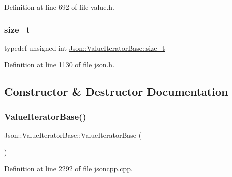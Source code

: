 Definition at line 692 of file value.\+h.

\hypertarget{class_json_1_1_value_iterator_base_a9d3a3c7ce5cdefe23cb486239cf07bb5}{}\label{class_json_1_1_value_iterator_base_a9d3a3c7ce5cdefe23cb486239cf07bb5} 
\subsubsection{\texorpdfstring{size\+\_\+t}{size\_t}\hspace{0.1cm}{\footnotesize\ttfamily [2/2]}}
{\footnotesize\ttfamily typedef unsigned int \hyperlink{class_json_1_1_value_iterator_base_a9d3a3c7ce5cdefe23cb486239cf07bb5}{Json\+::\+Value\+Iterator\+Base\+::size\+\_\+t}}



Definition at line 1130 of file json.\+h.



\subsection{Constructor \& Destructor Documentation}
\hypertarget{class_json_1_1_value_iterator_base_af45b028d9ff9cbd2554a87878b42dd75}{}\label{class_json_1_1_value_iterator_base_af45b028d9ff9cbd2554a87878b42dd75} 
\subsubsection{\texorpdfstring{Value\+Iterator\+Base()}{ValueIteratorBase()}\hspace{0.1cm}{\footnotesize\ttfamily [1/4]}}
{\footnotesize\ttfamily Json\+::\+Value\+Iterator\+Base\+::\+Value\+Iterator\+Base (\begin{DoxyParamCaption}{ }\end{DoxyParamCaption})}



Definition at line 2292 of file jsoncpp.\+cpp.

\hypertarget{class_json_1_1_value_iterator_base_a640e990e5f03a96fd650122a2906f59d}{}\label{class_json_1_1_value_iterator_base_a640e990e5f03a96fd650122a2906f59d} 
